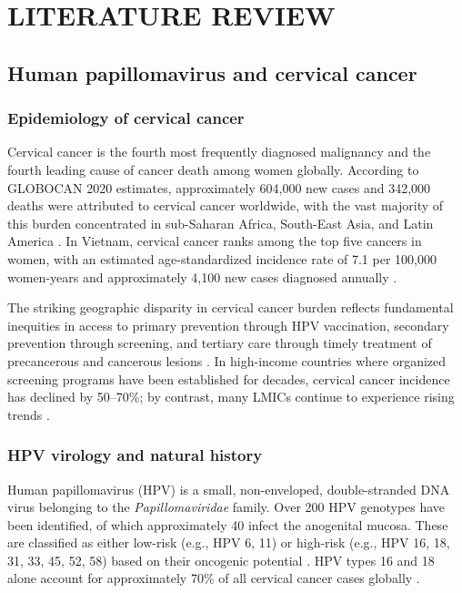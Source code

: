 \chapter{LITERATURE REVIEW}

\section{Human papillomavirus and cervical cancer}

\subsection{Epidemiology of cervical cancer}

Cervical cancer is the fourth most frequently diagnosed malignancy and the fourth leading cause of cancer death among women globally. According to GLOBOCAN 2020 estimates, approximately 604,000 new cases and 342,000 deaths were attributed to cervical cancer worldwide, with the vast majority of this burden concentrated in sub-Saharan Africa, South-East Asia, and Latin America \cite{sung2021}. In Vietnam, cervical cancer ranks among the top five cancers in women, with an estimated age-standardized incidence rate of 7.1 per 100,000 women-years and approximately 4,100 new cases diagnosed annually \cite{globocan2020vn}.

The striking geographic disparity in cervical cancer burden reflects fundamental inequities in access to primary prevention through HPV vaccination, secondary prevention through screening, and tertiary care through timely treatment of precancerous and cancerous lesions \cite{arbyn2020}. In high-income countries where organized screening programs have been established for decades, cervical cancer incidence has declined by 50--70\%; by contrast, many LMICs continue to experience rising trends \cite{bray2018}.

\subsection{HPV virology and natural history}

Human papillomavirus (HPV) is a small, non-enveloped, double-stranded DNA virus belonging to the \textit{Papillomaviridae} family. Over 200 HPV genotypes have been identified, of which approximately 40 infect the anogenital mucosa. These are classified as either low-risk (e.g., HPV 6, 11) or high-risk (e.g., HPV 16, 18, 31, 33, 45, 52, 58) based on their oncogenic potential \cite{doorbar2012}. HPV types 16 and 18 alone account for approximately 70\% of all cervical cancer cases globally \cite{delemore2017}.

